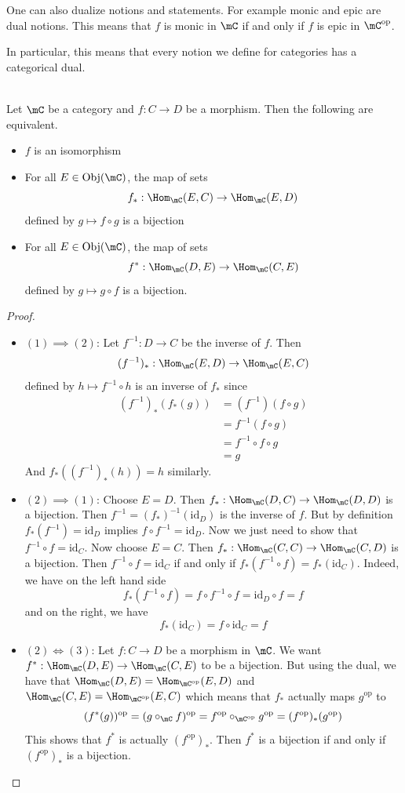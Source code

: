 \documentclass[a4paper]{article}
\begin{document}
One can also dualize notions and statements. For example monic and epic are dual notions. This means that $f$ is monic in $\mC$ if and only if $f$ is epic in $\mC^\text{op}$. 

In particular, this means that every notion we define for categories has a categorical dual. 

\begin{lmm}{}{}\\
Let $\mC$ be a category and $f:C\to D$ be a morphism. Then the following are equivalent. 
\begin{itemize}
\item $f$ is an isomorphism
\item For all $E\in\text{Obj}(\mC)$, the map of sets $$f_\ast:\Hom_\mC(E,C)\to\Hom_\mC(E,D)$$ defined by $g\mapsto f\circ g$ is a bijection
\item For all $E\in\text{Obj}(\mC)$, the map of sets $$f^\ast:\Hom_\mC(D,E)\to\Hom_\mC(C,E)$$ defined by $g\mapsto g\circ f$ is a bijection. 
\end{itemize} 
\begin{proof}~\\
\begin{itemize}
\item $(1)\implies(2)$: Let $f^{-1}:D\to C$ be the inverse of $f$. Then $$(f^{-1})_\ast:\Hom_\mC(E,D)\to\Hom_\mC(E,C)$$ defined by $h\mapsto f^{-1}\circ h$ is an inverse of $f_\ast$ since 
\begin{align*}
(f^{-1})_\ast(f_\ast(g))&=(f^{-1})(f\circ g)\\
&=f^{-1}(f\circ g)\\
&=f^{-1}\circ f\circ g\tag{Associativity of morphisms}\\
&=g
\end{align*}
And $f_\ast((f^{-1})_\ast(h))=h$ similarly. 
\item $(2)\implies(1)$: Choose $E=D$. Then $f_\ast:\Hom_\mC(D,C)\to\Hom_\mC(D,D)$ is a bijection. Then $f^{-1}=(f_\ast)^{-1}(\text{id}_D)$ is the inverse of $f$. But by definition $f_\ast(f^{-1})=\text{id}_D$ implies $f\circ f^{-1}=\text{id}_D$. Now we just need to show that $f^{-1}\circ f=\text{id}_C$. Now choose $E=C$. Then $f_\ast:\Hom_\mC(C,C)\to\Hom_\mC(C,D)$ is a bijection. Then $f^{-1}\circ f=\text{id}_C$ if and only if $f_\ast(f^{-1}\circ f)=f_\ast(\text{id}_C)$. Indeed, we have on the left hand side $$f_\ast(f^{-1}\circ f)=f\circ f^{-1}\circ f=\text{id}_D\circ f=f$$ and on the right, we have $$f_\ast(\text{id}_C)=f\circ \text{id}_C=f$$
\item $(2)\iff(3)$: Let $f:C\to D$ be a morphism in $\mC$. We want $f^\ast:\Hom_\mC(D,E)\to\Hom_\mC(C,E)$ to be a bijection. But using the dual, we have that $\Hom_\mC(D,E)=\Hom_{\mC^{\text{op}}}(E,D)$ and $\Hom_\mC(C,E)=\Hom_{\mC^{\text{op}}}(E,C)$ which means that $f_\ast$ actually maps $g^{\text{op}}$ to $$(f^\ast(g))^{\text{op}}=(g\circ_\mC f)^{\text{op}}=f^{\text{op}}\circ_{\mC^{\text{op}}}g^{\text{op}}=(f^{\text{op}})_\ast(g^{\text{op}})$$ This shows that $f^\ast$ is actually $(f^{\text{op}})_\ast$. Then $f^\ast$ is a bijection if and only if $(f^{\text{op}})_\ast$ is a bijection. 
\end{itemize}
\end{proof}
\end{lmm}
\end{document}
